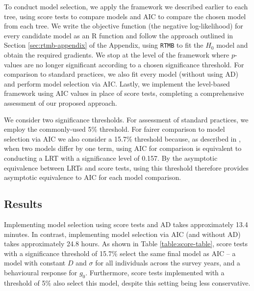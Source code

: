 \documentclass{article}
\begin{document}
To conduct model selection, we apply the framework we described
earlier to each tree, using score tests to
compare models and AIC to compare the chosen model from each tree. We
write the objective function 
(the negative log-likelihood) for every candidate model as an R 
function and follow the approach outlined in Section \ref{sec:rtmb-appendix}  
of the Appendix, using \lstinline{RTMB} to fit the $H_0$ model and
obtain the required gradients. We stop at the level of the framework
where $p$-values are no longer 
significant according to a chosen significance threshold. For comparison to
standard practices, we also fit every model (without 
using AD) and perform model selection via AIC. Lastly, we
implement the level-based framework using AIC values in place of score
tests, completing a comprehensive assessment of our proposed
approach.

We consider two significance thresholds. For assessment of
standard practices, we employ the commonly-used 5\% threshold. For
fairer comparison to model selection via AIC we also consider a 15.7\%
threshold because, as described in   
\textcite{sutherland2023}, when two models differ by one term,
using AIC for comparison is equivalent to  
conducting a LRT with a significance level of 0.157. By the asymptotic
equivalence between LRTs and score tests, using this threshold
therefore provides asymptotic equivalence to AIC for each model
comparison.

\subsection{Results}
\label{sec:ex-results}

Implementing model selection using score tests and AD takes approximately 13.4 
minutes. In contrast, implementing model selection via AIC (and
without AD) takes approximately 24.8 hours. As shown in Table
\ref{table:score-table}, score tests with a significance threshold of
15.7\% select the same final model as AIC -- a model with constant $D$ and
$\sigma$ for all individuals across the survey years, and a behavioural
response for $g_0$. Furthermore, score tests implemented with a
threshold of 5\% also select this model, despite this setting being
less conservative.
\end{document}
